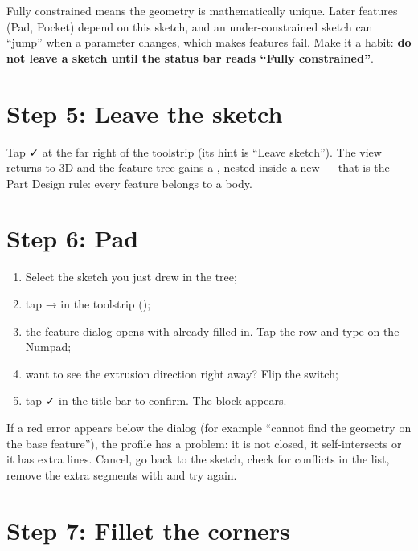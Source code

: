 \begin{tip}
Fully constrained means the geometry is mathematically unique. Later features (Pad, Pocket) depend on this
sketch, and an under-constrained sketch can “jump” when a parameter changes, which makes features fail. Make it
a habit: \textbf{do not leave a sketch until the status bar reads “Fully constrained”}.
\end{tip}

\section{Step 5: Leave the sketch}

Tap ✓ at the far right of the toolstrip (its hint is “Leave sketch”). The view returns to 3D and the feature
tree gains a , nested inside a new  — that is the Part Design rule: every feature belongs
to a body.

\section{Step 6: Pad}

\begin{enumerate}
  \item Select the sketch you just drew in the tree;
  \item tap  →  in the toolstrip ();
  \item the feature dialog opens with  already filled in. Tap the  row and type
         on the Numpad;
  \item want to see the extrusion direction right away? Flip the  switch;
  \item tap ✓ in the title bar to confirm. The block appears.
\end{enumerate}

\begin{warn}
If a red error appears below the dialog (for example “cannot find the geometry on the base feature”), the
profile has a problem: it is not closed, it self-intersects or it has extra lines. Cancel, go back to the
sketch, check for conflicts in the  list, remove the extra segments with  and try
again.
\end{warn}

\section{Step 7: Fillet the corners}

